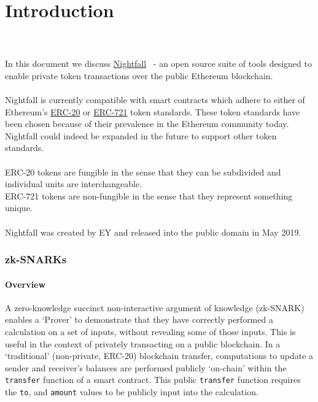 \newpage

\part{Introduction}
\label{part:introduction}
\parttoc

\ \\
\\
\noindent
In this document we discuss \href{https://github.com/EYBlockchain/nightfall}{Nightfall}~\cite{nightfall} - an open source suite of tools designed to enable private token transactions over the public Ethereum blockchain.\\
\\
Nightfall is currently compatible with smart contracts which adhere to either of Ethereum's \href{https://github.com/ethereum/EIPs/blob/master/EIPS/eip-20.md}{ERC-20} or \href{https://github.com/ethereum/EIPs/blob/master/EIPS/eip-721.md}{ERC-721} token standards. These token standards have been chosen because of their prevalence in the Ethereum community today. Nightfall could indeed be expanded in the future to support other token standards.\\
\\
ERC-20 tokens are fungible in the sense that they can be subdivided and individual units are interchangeable.\\
ERC-721 tokens are non-fungible in the sense that they represent something unique.\\
\\
Nightfall was created by EY and released into the public domain in May 2019.





\section{zk-SNARKs}
\label{sec:zkSnarks}

\subsection{Overview}
A zero-knowledge succinct non-interactive argument of knowledge (zk-SNARK) enables a `Prover' to demonstrate that they have correctly performed a calculation on a set of inputs, without revealing some of those inputs.  This is useful in the context of privately transacting on a public blockchain. In a `traditional' (non-private, ERC-20) blockchain transfer, computations to update a sender and receiver's balances are performed publicly `on-chain' within the \texttt{transfer} function of a smart contract. This public \texttt{transfer} function requires the \texttt{to}, and \texttt{amount} values to be publicly input into the calculation.

